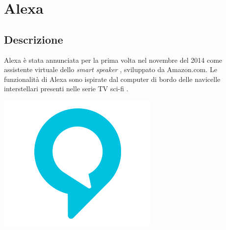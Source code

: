 \documentclass[a4paper,titlepage]{article}
\begin{document}
\newpage
	\section{Alexa}
	\subsection{Descrizione}
	\begin{minipage}{0.7\textwidth}\raggedright
		Alexa è stata annunciata per la prima volta nel novembre del 2014 come assistente virtuale dello \textit{smart speaker} , sviluppato da Amazon.com.
		Le funzionalità di Alexa sono ispirate dal computer di bordo delle navicelle interstellari presenti nelle serie TV sci-fi .

	\end{minipage}
	\hfill
	\noindent\begin{minipage}{0.1\textwidth}
		\includegraphics[scale=0.3]{images/alexa.png}
	\end{minipage}
\end{document}
